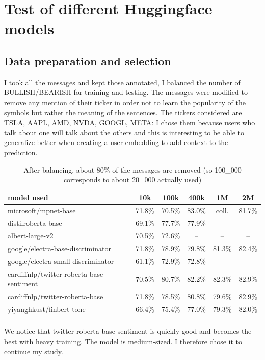 \documentclass[12pt]{article}
\begin{document}
\section{Test of different Huggingface models}

\subsection{Data preparation and selection}
I took all the messages and kept those annotated, I balanced the number of BULLISH/BEARISH for training and testing.
The messages were modified to remove any mention of their ticker in order not to learn the popularity of the symbols but rather the meaning of the sentences.
The tickers considered are TSLA, AAPL, AMD, NVDA, GOOGL, META: I chose them because users who talk about one will talk about the others and this is interesting to be able to generalize better when creating a user embedding to add context to the prediction.


\begin{longtable}{lccccc}
\caption{Model used / number of messages used / accuracy on balanced dataset} \\
\toprule
\textbf{model used} & 10k & 100k & 400k & 1M & 2M \\
\midrule
microsoft/mpnet-base & 71.8\% & 70.5\% & 83.0\% & coll. & 81.7\% \\
distilroberta-base & 69.1\% & 77.7\% & 77.9\% & -- & -- \\
albert-large-v2 & 70.5\% & 72.6\% & -- & -- & -- \\
google/electra-base-discriminator & 71.8\% & 78.9\% & 79.8\% & 81.3\% & 82.4\% \\
google/electra-small-discriminator & 61.1\% & 72.9\% & 72.8\% & -- & -- \\
cardiffnlp/twitter-roberta-base-sentiment & 70.5\% & 80.7\% & 82.2\% & 82.3\% & 82.9\% \\
cardiffnlp/twitter-roberta-base & 71.8\% & 78.5\% & 80.8\% & 79.6\% & 82.9\% \\
yiyanghkust/finbert-tone & 66.4\% & 75.4\% & 77.0\% & 79.3\% & 82.0\% \\
\bottomrule
\caption*{\small After balancing, about 80\% of the messages are removed (so 100\_000 corresponds to about 20\_000 actually used)}
\end{longtable}


We notice that twitter-roberta-base-sentiment is quickly good and becomes the best with heavy training. The model is medium-sized.
I therefore chose it to continue my study.
\end{document}
